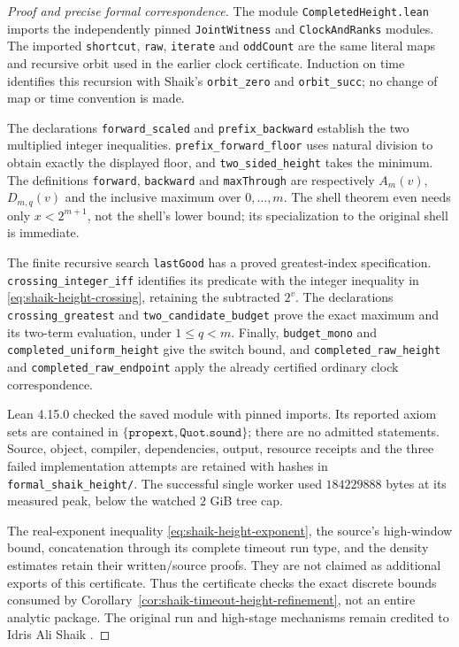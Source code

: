 \documentclass[11pt]{article}
\theoremstyle{remark}\newtheorem{remark}[proposition]{Remark}
\begin{document}
\begin{proof}[Proof and precise formal correspondence]
The module \texttt{CompletedHeight.lean} imports the independently pinned
\texttt{JointWitness} and \texttt{ClockAndRanks} modules. The imported
\texttt{shortcut}, \texttt{raw}, \texttt{iterate} and \texttt{oddCount}
are the same literal maps and recursive orbit used in the earlier
clock certificate. Induction on time identifies this recursion with
Shaik's \texttt{orbit\_zero} and \texttt{orbit\_succ}; no change of map
or time convention is made.

The declarations \texttt{forward\_scaled} and
\texttt{prefix\_backward} establish the two multiplied integer
inequalities. \texttt{prefix\_forward\_floor} uses natural division to
obtain exactly the displayed floor, and \texttt{two\_sided\_height}
takes the minimum. The definitions \texttt{forward}, \texttt{backward}
and \texttt{maxThrough} are respectively \(A_m(v)\), \(D_{m,q}(v)\)
and the inclusive maximum over \(0,\ldots,m\).
The shell theorem even needs only \(x<2^{m+1}\), not the shell's lower
bound; its specialization to the original shell is immediate.

The finite recursive search \texttt{lastGood} has a proved greatest-index
specification. \texttt{crossing\_integer\_iff} identifies its predicate
with the integer inequality in \eqref{eq:shaik-height-crossing}, retaining
the subtracted \(2^v\). The declarations \texttt{crossing\_greatest}
and \texttt{two\_candidate\_budget} prove the exact maximum and its
two-term evaluation, under \(1\le q<m\).
Finally, \texttt{budget\_mono} and \texttt{completed\_uniform\_height}
give the switch bound, and \texttt{completed\_raw\_height} and
\texttt{completed\_raw\_endpoint} apply the already certified ordinary
clock correspondence.

Lean 4.15.0 checked the saved module with pinned imports. Its reported
axiom sets are contained in \(\{\texttt{propext},\texttt{Quot.sound}\}\);
there are no admitted statements. Source, object, compiler, dependencies,
output, resource receipts and the three failed implementation attempts
are retained with hashes in \texttt{formal\_shaik\_height/}.
The successful single worker used \(184229888\) bytes at its measured
peak, below the watched \(2\) GiB tree cap.

The real-exponent inequality \eqref{eq:shaik-height-exponent}, the
source's high-window bound, concatenation through its complete timeout
run type, and the density estimates retain their written/source proofs.
They are not claimed as additional exports of this certificate.
Thus the certificate checks the exact discrete bounds consumed by
Corollary~\ref{cor:shaik-timeout-height-refinement}, not an entire analytic
package. The original run and high-stage mechanisms remain credited to
Idris Ali Shaik \cite{Shaik2026v324}.
\end{proof}
\end{document}

